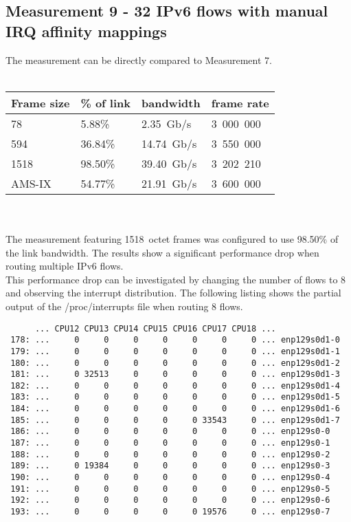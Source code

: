 
\subsection{Measurement 9 - 32 IPv6 flows with manual IRQ affinity mappings}
The measurement can be directly compared to Measurement 7.
\\
\\
\begin{tabular}{ | l | l | l | l | }
\hline
Frame size & \% of link & bandwidth & frame rate \\
\hline
78     &  5.88\% &  2.35~Gb/s & 3~000~000 \\
594    & 36.84\% & 14.74~Gb/s & 3~550~000 \\
1518   & 98.50\% & 39.40~Gb/s & 3~202~210 \\
AMS-IX & 54.77\% & 21.91~Gb/s & 3~600~000 \\
\hline
\end{tabular}
\\
\\
The measurement featuring 1518~octet frames was configured to use 98.50\% of the link bandwidth.
The results show a significant performance drop when routing multiple IPv6 flows.
\\
This performance drop can be investigated by changing the number of flows to 8
and observing the interrupt distribution.
The following listing shows the partial output of the /proc/interrupts file when routing 8 flows.
\begin{lstlisting}
      ... CPU12 CPU13 CPU14 CPU15 CPU16 CPU17 CPU18 ...
 178: ...     0     0     0     0     0     0     0 ... enp129s0d1-0
 179: ...     0     0     0     0     0     0     0 ... enp129s0d1-1
 180: ...     0     0     0     0     0     0     0 ... enp129s0d1-2
 181: ...     0 32513     0     0     0     0     0 ... enp129s0d1-3
 182: ...     0     0     0     0     0     0     0 ... enp129s0d1-4
 183: ...     0     0     0     0     0     0     0 ... enp129s0d1-5
 184: ...     0     0     0     0     0     0     0 ... enp129s0d1-6
 185: ...     0     0     0     0     0 33543     0 ... enp129s0d1-7
 186: ...     0     0     0     0     0     0     0 ... enp129s0-0
 187: ...     0     0     0     0     0     0     0 ... enp129s0-1
 188: ...     0     0     0     0     0     0     0 ... enp129s0-2
 189: ...     0 19384     0     0     0     0     0 ... enp129s0-3
 190: ...     0     0     0     0     0     0     0 ... enp129s0-4
 191: ...     0     0     0     0     0     0     0 ... enp129s0-5
 192: ...     0     0     0     0     0     0     0 ... enp129s0-6
 193: ...     0     0     0     0     0 19576     0 ... enp129s0-7
\end{lstlisting}
